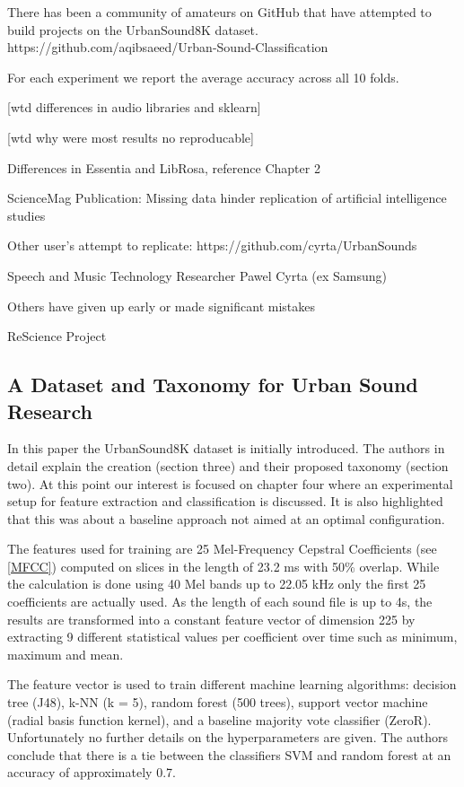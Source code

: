 There has been a community of amateurs on GitHub that have attempted to build projects on the UrbanSound8K dataset. https://github.com/aqibsaeed/Urban-Sound-Classification



For each experiment we report the average accuracy across all 10 folds.

[wtd differences in audio libraries and sklearn]

[wtd why were most results no reproducable]

Differences in Essentia and LibRosa, reference Chapter 2



ScienceMag Publication: Missing data hinder replication of artificial intelligence studies

Other user's attempt to replicate: https://github.com/cyrta/UrbanSounds

Speech and Music Technology Researcher Pawel Cyrta (ex Samsung)

Others have given up early or made significant mistakes

ReScience Project


\subsection{A Dataset and Taxonomy for Urban Sound Research}

In this paper \cite{Salamon:UrbanSound:ACMMM:14} the UrbanSound8K dataset is initially introduced. The authors in detail explain the creation (section three) and their proposed taxonomy (section two). At this point  our interest is focused on chapter four where an experimental setup for feature extraction and classification is discussed. It is also highlighted that this was about a baseline approach not aimed at an optimal configuration.

The features used for training are 25 Mel-Frequency Cepstral Coefficients (see \ref{MFCC}) computed on slices in the length of 23.2 ms with 50\% overlap. While the calculation is done using 40 Mel bands up to 22.05 kHz only the first 25 coefficients are actually used. As the length of each sound file is up to 4s, the results are transformed into a constant feature vector of dimension 225 by extracting 9 different statistical values per coefficient over time such as minimum, maximum and mean.

The feature vector is used to train different machine learning algorithms: decision tree (J48), k-NN (k = 5), random forest (500 trees), support vector machine (radial basis function kernel), and a baseline majority vote classifier (ZeroR). Unfortunately no further details on the hyperparameters are given. The authors conclude that there is a tie between the classifiers SVM and random forest at an accuracy of approximately 0.7.

